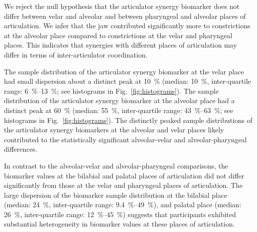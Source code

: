 \documentclass[reprint]{JASAnew}\usepackage[]{graphicx}\usepackage[]{color}
\begin{document}
We reject the null hypothesis that the articulator synergy biomarker does not differ between velar and alveolar and between pharyngeal and alveolar places of articulation. 
%
We infer that the jaw contributed significantly more to constrictions at the alveolar place compared to constrictions at the velar and pharyngeal places.
%
This indicates that synergies with different places of articulation may differ in terms of inter-articulator coordination.




The sample distribution of the articulator synergy biomarker at the velar place had small dispersion about a distinct peak at \SI{10}{\percent} 
%
(median: \SI{10}{\percent}, 
inter-quartile range: \SIrange{6}{13}{\percent}; see histograms in Fig.~\ref{fig:histograms}).
%
The sample distribution of the articulator synergy biomarker at the alveolar place had a distinct peak at \SI{60}{\percent}
%
(median: \SI{55}{\percent}, 
inter-quartile range: \SIrange{43}{63}{\percent}; see histograms in Fig.~\ref{fig:histograms}).
%
The distinctly peaked sample distributions of the articulator synergy biomarkers at the alveolar and velar places likely contributed to the statistically significant alveolar-velar and alveolar-pharyngeal differences.



In contrast to the alveolar-velar and alveolar-pharyngeal comparisons, the biomarker values at the bilabial and palatal places of articulation did not differ significantly from those at the velar and pharyngeal places of articulation. 
%
The large dispersion of the biomarker sample distribution at the bilabial place
%
(median: \SI{24}{\percent}, 
inter-quartile range: \SIrange{9.4}{49}{\percent}), 
%
and palatal place
%
(median: \SI{26}{\percent}, 
inter-quartile range: \SIrange{12}{45}{\percent})
%
suggests that participants exhibited substantial heterogeneity in biomarker values at these places of articulation. 
\end{document}
